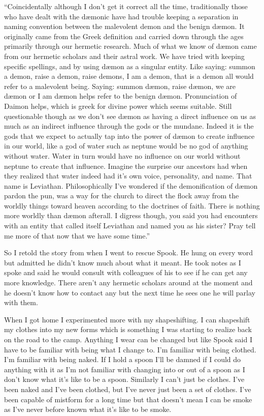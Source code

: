 ``Coincidentally although I don't get it correct all the time, traditionally those who have dealt with the d\ae monic have had trouble keeping a separation in naming convention between the malevolent demon and the benign d\ae mon. It originally came from the Greek definition and carried down through the ages primarily through our hermetic research. Much of what we know of d\ae mon came from our hermetic scholars and their astral work. We have tried with keeping specific spellings, and by using d\ae mon as a singular entity. Like saying: summon a demon, raise a demon, raise demons, I am a demon, that is a demon all would refer to a malevolent being. Saying: summon d\ae mon, raise d\ae mon, we are d\ae mon or I am d\ae mon helps refer to the benign d\ae mon. Pronunciation of Daimon helps, which is greek for divine power which seems suitable. Still questionable though as we don't see d\ae mon as having a direct influence on us as much as an indirect influence through the gods or the mundane. Indeed it is the gods that we expect to actually tap into the power of d\ae mon to create influence in our world, like a god of water such as neptune would be no god of anything without water. Water in turn would have no influence on our world without neptune to create that influence. Imagine the surprise our ancestors had when they realized that water indeed had it's own voice, personality, and name. That name is Leviathan. Philosophically I've wondered if the demonification of d\ae mon pardon the pun, was a way for the church to direct the flock away from the worldly things toward heaven according to the doctrines of faith. There is nothing more worldly than d\ae mon afterall. I digress though, you said you had encounters with an entity that called itself Leviathan and named you as his sister? Pray tell me more of that now that we have some time.''

So I retold the story from when I went to rescue Spook. He hung on every word but admitted he didn't know much about what it meant. He took notes as I spoke and said he would consult with colleagues of his to see if he can get any more knowledge. There aren't any hermetic scholars around at the moment and he doesn't know how to contact any but the next time he sees one he will parlay with them.

When I got home I experimented more with my shapeshifting. I can shapeshift my clothes into my new forms which is something I was starting to realize back on the road to the camp. Anything I wear can be changed but like Spook said I have to be familiar with being what I change to. I'm familiar with being clothed. I'm familiar with being naked. If I hold a spoon I'll be damned if I could do anything with it as I'm not familiar with changing into or out of a spoon as I don't know what it's like to be a spoon. Similarly I can't just be clothes. I've been naked and I've been clothed, but I've never just been a set of clothes. I've been capable of mistform for a long time but that doesn't mean I can be smoke as I've never before known what it's like to be smoke. 

